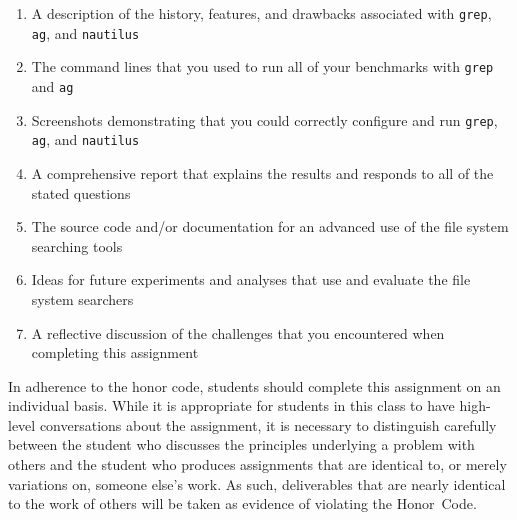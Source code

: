 \vspace*{-.05in}
\begin{enumerate}

  \itemsep0in

  \item A description of the history, features, and drawbacks associated with {\tt grep}, {\tt ag}, and {\tt nautilus} 

  \item The command lines that you used to run all of your benchmarks with {\tt grep} and {\tt ag} 

  \item Screenshots demonstrating that you could correctly configure and run {\tt grep}, {\tt ag}, and {\tt nautilus} 

  \item A comprehensive report that explains the results and responds to all of the stated questions 

  \item The source code and/or documentation for an advanced use of the file system searching tools

  \item Ideas for future experiments and analyses that use and evaluate the file system searchers 

  \item A reflective discussion of the challenges that you encountered when completing this assignment

\end{enumerate}
\vspace*{-.05in}

In adherence to the honor code, students should complete this assignment on an individual basis. While it is appropriate
for students in this class to have high-level conversations about the assignment, it is necessary to distinguish
carefully between the student who discusses the principles underlying a problem with others and the student who produces
assignments that are identical to, or merely variations on, someone else's work.  As such, deliverables that are nearly
identical to the work of others will be taken as evidence of violating the \mbox{Honor Code}.  

  
